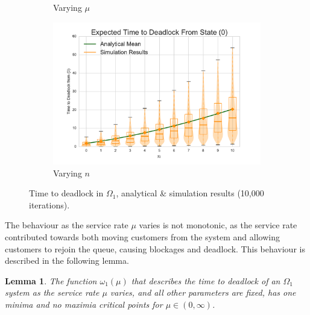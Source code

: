 \documentclass{article}
\newtheorem{lemma}{Lemma}
\begin{document}
\begin{figure}[!htbp]
\begin{subfigure}[b]{0.5\textwidth}
  \caption{Varying $\mu$}
  \label{fig:timestodeadlock_mu}
\end{subfigure}
\begin{subfigure}[b]{0.5\textwidth}
  \includegraphics[width=\textwidth]{images/varyn}
  \caption{Varying $n$}
  \label{fig:timestodeadlock_n}
\end{subfigure}
\caption{Time to deadlock in $\Omega_1$, analytical \& simulation results (10,000 iterations).}
\label{fig:timestodeadlock}
\end{figure}

The behaviour as the service rate $\mu$ varies is not monotonic, as the service rate contributed towards both moving customers from the system and allowing customers to rejoin the queue, causing blockages and deadlock.
This behaviour is described in the following lemma.\\

\begin{lemma}\label{lem:oneminima}
The function $\omega_1(\mu)$ that describes the time to deadlock of an $\Omega_1$ system as the service rate $\mu$ varies, and all other parameters are fixed, has one minima and no maximia critical points for $\mu \in (0, \infty)$.
\end{lemma}
\end{document}
